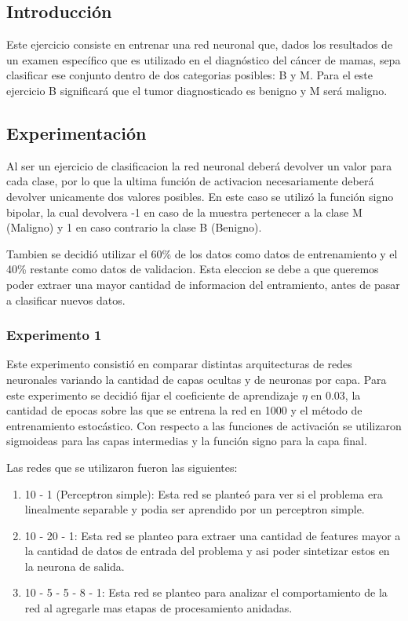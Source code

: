 \subsection{Introducción}
Este ejercicio consiste en entrenar una red neuronal que, dados los resultados de un examen específico que es utilizado en el diagnóstico del
cáncer de mamas, sepa clasificar ese conjunto dentro de dos categorias posibles: B y M. Para el este ejercicio B significará que el tumor diagnosticado
es benigno y M será maligno.

\subsection{Experimentación}
Al ser un ejercicio de clasificacion la red neuronal deberá devolver un valor para cada clase, por lo que la ultima función de activacion necesariamente
deberá devolver unicamente dos valores posibles. En este caso se utilizó la función signo bipolar, la cual devolvera -1 en caso de la muestra pertenecer
a la clase M (Maligno) y 1 en caso contrario la clase B (Benigno).

Tambien se decidió utilizar el 60\% de los datos como datos de entrenamiento y el 40\% restante como datos de validacion. Esta eleccion se debe a que
queremos poder extraer una mayor cantidad de informacion del entramiento, antes de pasar a clasificar nuevos datos.

\subsubsection{Experimento 1}
Este experimento consistió en comparar distintas arquitecturas de redes neuronales variando la cantidad de capas ocultas y de neuronas por capa.
Para este experimento se decidió fijar el coeficiente de aprendizaje $\eta$ en 0.03, la cantidad de epocas sobre las que se entrena la red en 1000 y el
método de entrenamiento estocástico. Con respecto a las funciones de activación se utilizaron sigmoideas para las capas intermedias y la función signo
para la capa final.

Las redes que se utilizaron fueron las siguientes:
\begin{enumerate}
  \item 10 - 1 (Perceptron simple): Esta red se planteó para ver si el problema era linealmente separable y podia ser aprendido por un perceptron
                                      simple.
  \item 10 - 20 - 1: Esta red se planteo para extraer una cantidad de features mayor a la cantidad de datos de entrada del problema y asi poder sintetizar
                      estos en la neurona de salida.
  \item 10 - 5 - 5 - 8 - 1: Esta red se planteo para analizar el comportamiento de la red al agregarle mas etapas de procesamiento anidadas.
\end{enumerate}

